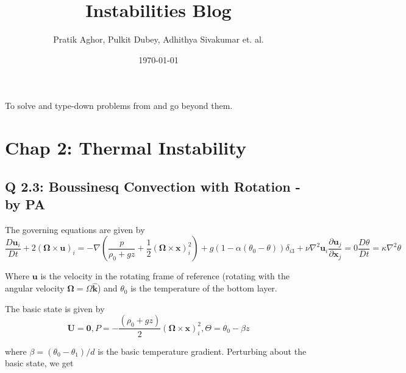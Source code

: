 \documentclass{article}
\author{Pratik Aghor, Pulkit Dubey, Adhithya Sivakumar et. al.}
\title{Instabilities Blog}
\date{\today}  %
\begin{document}
\maketitle
To solve and type-down problems from \cite{drazin2004hydrodynamic} and go beyond them. 
\section{Chap 2: Thermal Instability}
\subsection{Q 2.3: Boussinesq Convection with Rotation - by PA}
The governing equations are given by
\begin{subequations}
 \begin{equation}
  \frac{D\boldsymbol{u}_{i}}{Dt} + 2 (\boldsymbol{\Omega} \times \boldsymbol{u})_{i} = -\nabla \left(\frac{p}{\rho_{0} + gz} + \frac{1}{2}(\boldsymbol{\Omega} \times \boldsymbol{x})_{i}^{2}\right) + g ( 1 - \alpha  (\theta_{0} - \theta) ) \delta_{i3} + \nu \nabla^{2} \boldsymbol{u}_{i}
 \end{equation}
 \begin{equation}
  \frac{\partial \boldsymbol{u}_{j}}{\partial \boldsymbol{x}_{j}} = 0
 \end{equation}
 \begin{equation}
  \frac{D\theta}{Dt} = \kappa \nabla^{2} \theta
 \end{equation}
\end{subequations}

Where $\boldsymbol{u}$ is the velocity in the rotating frame of reference (rotating with the angular velocity $\boldsymbol{\Omega} = \Omega \boldsymbol{\hat{k}}$) and $\theta_{0}$ is the temperature of the bottom layer.

The basic state is given by
\begin{equation}
 \boldsymbol{U} = \boldsymbol{0}, P = - \frac{(\rho_{0} + gz)}{2} (\boldsymbol{\Omega} \times \boldsymbol{x})_{i}^{2}, \Theta = \theta_{0} - \beta z
\end{equation}

where $\beta = (\theta_{0} - \theta_{1})/d$ is the basic temperature gradient. Perturbing about the basic state, we get
\end{document}
